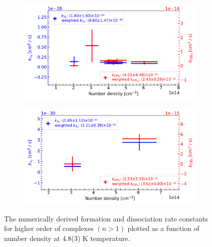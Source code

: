 \begin{figure}[!htb]
    \begin{subfigure}[b]{0.49\textwidth}
        \centering
        \includegraphics[width=1\textwidth]{figures/measurements/kinetics/rate-constants-higher-order/off_4.8K_k3_kCID_4_as_functionOfnHe.pdf}
        \caption{}
        
    \end{subfigure}
    \hfill
    \begin{subfigure}[b]{0.49\textwidth}
        \centering
        \includegraphics[width=1\textwidth]{figures/measurements/kinetics/rate-constants-higher-order/off_4.8K_k3_kCID_5_as_functionOfnHe.pdf}
        \caption{}
        
    \end{subfigure}
    
    \caption{The numerically derived formation and dissociation rate constants for higher order of complexes $(n>1)$ plotted as a function of number density at 4.8(3) K temperature.}
    \label{fig:rate-constants-higher-order}

\end{figure}